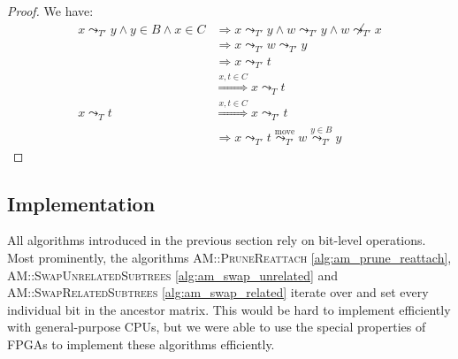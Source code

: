 \begin{proof}
    We have:
    \begin{align*}
        x \leadsto_{T'} y \wedge y \in B \wedge x \in C &\Rightarrow x \leadsto_{T'} y \wedge w \leadsto_{T'} y \wedge w \not\leadsto_{T'} x \\
        &\Rightarrow x \leadsto_{T'} w \leadsto_{T'} y \\
        &\Rightarrow x \leadsto_{T'} t \\
        &\stackrel{x, t \in C}{\Rightarrow} x \leadsto_T t \\
        x \leadsto_T t &\stackrel{x, t \in C}{\Rightarrow} x \leadsto_{T'} t \\
        &\Rightarrow x \leadsto_{T'} t \stackrel{\text{move}}{\leadsto_{T'}} w \stackrel{y \in B}{\leadsto_{T'}} y
    \end{align*}
\end{proof}

\subsection{Implementation}
\label{sec:encoding_implementation}

All algorithms introduced in the previous section rely on bit-level operations. Most prominently, the algorithms \textsc{AM::PruneReattach} \ref{alg:am_prune_reattach}, \textsc{AM::SwapUnrelatedSubtrees} \ref{alg:am_swap_unrelated} and \textsc{AM::SwapRelatedSubtrees} \ref{alg:am_swap_related} iterate over and set every individual bit in the ancestor matrix. This would be hard to implement efficiently with general-purpose \acp{CPU}, but we were able to use the special properties of \acp{FPGA} to implement these algorithms efficiently.

